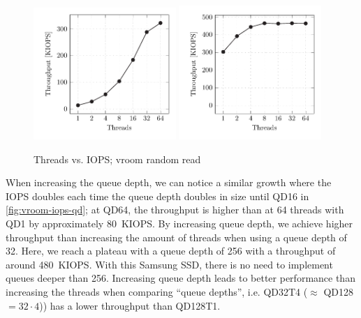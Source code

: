 \begin{figure}[H]
  \centering
   {\includegraphics[width=0.48\textwidth]{figures/vroom-iops-thread} \label{fig:vroom-iops-thread-qd1}}
   {\includegraphics[width=0.48\textwidth]{figures/vroom-iops-thread-qd32} \label{fig:vroom-iops-thread-qd32}}
  \caption{Threads vs. IOPS; vroom random read}
  \label{fig:vroom-iops-thread}
\end{figure}

When increasing the queue depth, we can notice a similar growth where the IOPS doubles each time the queue depth doubles in size until QD16 in \autoref{fig:vroom-iops-qd}; at QD64, the throughput is higher than at 64 threads with QD1 by approximately \qty{80}{KIOPS}. By increasing queue depth, we achieve higher throughput than increasing the amount of threads when using a queue depth of 32. Here, we reach a plateau with a queue depth of 256 with a throughput of around \qty{480}{KIOPS}. With this Samsung SSD, there is no need to implement queues deeper than 256. Increasing queue depth leads to better performance than increasing the threads when comparing ``queue depths'', i.e. QD32T4 ($\approx$ QD128$=32 \cdot 4$)) has a lower throughput than QD128T1.

